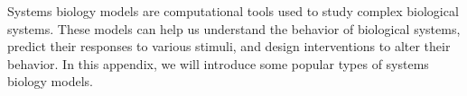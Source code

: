 \label{appendix:models}
Systems biology models are computational tools used to study complex biological systems. These models can help us understand the behavior of biological systems, predict their responses to various stimuli, and design interventions to alter their behavior. In this appendix, we will introduce some popular types of systems biology models.





